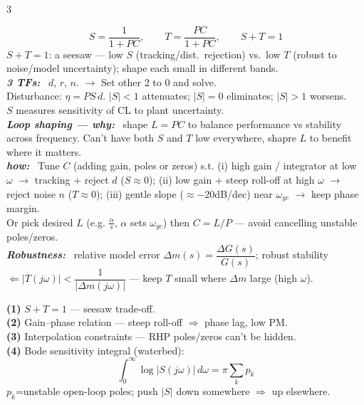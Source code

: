 \documentclass[9pt]{extarticle}
\newcommand{\sect}[1]{%
  \vspace{2pt}\par\noindent
  \colorbox{hdrbg}{\makebox[\dimexpr\linewidth-2\fboxsep][l]{%
    \textbf{\footnotesize\textcolor{hdr}{#1}}}}%
  \par\vspace{1.5pt}}
\newcommand{\sub}[1]{\textit{\textbf{#1:}}\ }
\begin{document}
\begin{multicols}{3}
\sect{16. Sensitivity / Gang of Four (Lec 11)}
\[ S=\frac{1}{1+PC},\qquad T=\frac{PC}{1+PC},\qquad S+T=1 \]
$S{+}T{=}1$: a seesaw — low $S$ (tracking/dist.\ rejection) vs.\ low $T$ (robust to noise/model uncertainty); shape each small in different bands.\\
\sub{3 TFs} $d$, $r$, $n$. $\to$ Set other 2 to 0 and solve.\\
Disturbance: $\eta=PS\,d$. $|S|{<}1$ attenuates; $|S|{=}0$ eliminates; $|S|{>}1$ worsens.\\
$S$ measures sensitivity of CL to plant uncertainty.\\
\sub{Loop shaping — why} shape $L{=}PC$ to balance performance vs stability across frequency. Can't have both $S$ and $T$ low everywhere, shapre $L$ to benefit where it matters. \\
\sub{how} Tune $C$ (adding gain, poles or zeros) s.t. (i) high gain / integrator at low $\omega$ $\to$ tracking + reject $d$ ($S{\approx}0$); (ii) low gain + steep roll-off at high $\omega$ $\to$ reject noise $n$ ($T{\approx}0$); (iii) gentle slope ($\approx{-}20$dB/dec) near $\omega_{gc}$ $\to$ keep phase margin.\\
Or pick desired $L$ (e.g. $\tfrac{\alpha}{s}$, $\alpha$ sets $\omega_{gc}$) then $C{=}L/P$ — avoid cancelling unstable poles/zeros.\\
\sub{Robustness} relative model error $\Delta m(s){=}\dfrac{\Delta G(s)}{G(s)}$; robust stability $\Leftarrow|T(j\omega)|<\dfrac{1}{|\Delta m(j\omega)|}$ — keep $T$ small where $\Delta m$ large (high $\omega$).

\sect{17. Fundamental Limitations (Lec 11,12)}
\textbf{(1)} $S+T=1$ — seesaw trade-off.\\
\textbf{(2)} Gain–phase relation — steep roll-off $\Rightarrow$ phase lag, low PM.\\
\textbf{(3)} Interpolation constraints — RHP poles/zeros can't be hidden.\\
\textbf{(4)} Bode sensitivity integral (waterbed):
\[ \int_0^\infty\log|S(j\omega)|\,d\omega=\pi\sum_k p_k \]
$p_k$=unstable open-loop poles; push $|S|$ down somewhere $\Rightarrow$ up elsewhere.


\end{multicols}
\end{document}
